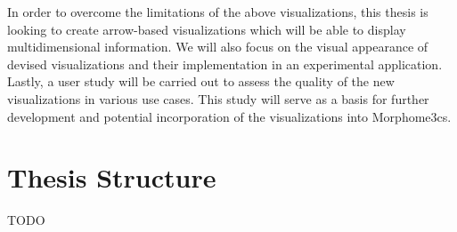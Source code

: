 In order to overcome the limitations of the above visualizations, this thesis is looking to create arrow-based visualizations which will be able to display multidimensional information. We will also focus on the visual appearance of devised visualizations and their implementation in an experimental application. Lastly, a user study will be carried out to assess the quality of the new visualizations in various use cases. This study will serve as a basis for further development and potential incorporation of the visualizations into Morphome3cs.
\section*{Thesis Structure}

TODO